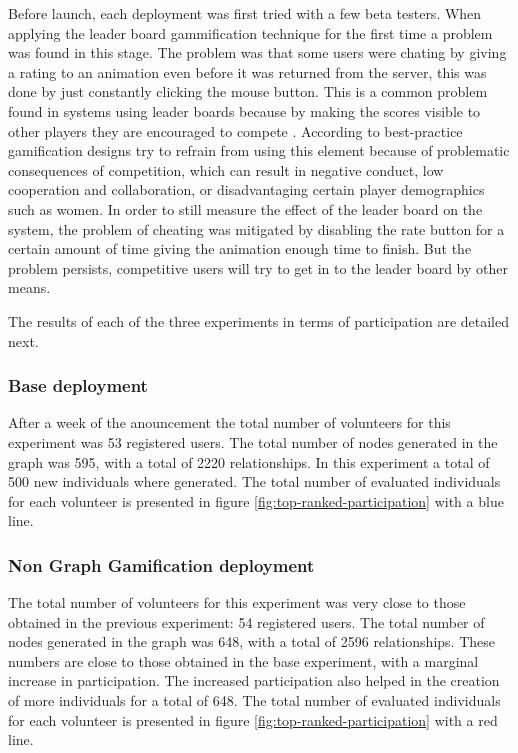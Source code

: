 \documentclass[conference]{IEEEtran}
\begin{document}
Before launch, each deployment was first tried with a few beta testers. When applying the leader board
gammification technique for the first time a problem was found in this stage. The problem was that some 
users were chating by giving a rating to an animation even before it was returned from the server, this was done by just
constantly clicking the mouse button. This is a common problem found in systems using leader boards because
by making the scores visible to other players they are encouraged to compete \cite{hickman2010total}. 
According to \cite{kumar2013gamification} best-practice gamification designs try to
refrain from using this element because of  problematic consequences of competition, which can result 
in negative conduct, low cooperation and collaboration, or disadvantaging certain player
demographics such as women. In order to still measure the effect of the leader board on the system, the 
problem of cheating was mitigated by disabling the rate button for a certain amount of time giving the animation
enough time to finish. But the problem persists, competitive users will try to get in to the leader board by other means.

%
The results of each of the three experiments in terms of participation are detailed next.

\subsubsection{ Base deployment}
After a week of the anouncement the total number of volunteers for this experiment was 53 registered users. 
The total number of nodes generated in the graph was 595, with a total of 2220 relationships. In this
experiment a total of 500 new individuals where generated. The total number of evaluated
individuals for each volunteer is presented in figure \ref{fig:top-ranked-participation} with a blue line. 


\subsubsection{ Non Graph Gamification deployment}
The total number of volunteers for this experiment was very close to those obtained in the previous
experiment: 54 registered users. The total number of nodes generated in the graph was 648, 
with a total of 2596 relationships. These numbers are close to those obtained in the base experiment,
with a marginal increase in participation. The increased participation also helped in the creation of
more individuals for a total of 648. The total number of evaluated
individuals for each volunteer is presented in figure \ref{fig:top-ranked-participation} with a red line. 
\end{document}
